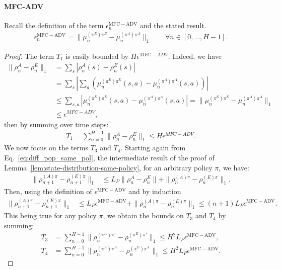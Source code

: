 \documentclass{article}
\begin{document}
\paragraph{MFC-ADV} Recall the definition of the term $\epsilon_n^\mathrm{MFC-ADV}$ and the stated result.
\begin{align}
    \epsilon^{\mathrm{MFC-ADV}}_n = \|\mu^{(\pi^E)\pi^E}_n - \mu^{(\pi^A)\pi^A}_n \|_1 \qquad \forall n \in [0, \dots, H-1].
\end{align}
\mfcgailbound*
\begin{proof}
The term $T_1$ is easily bounded by $H\epsilon^{MFC-ADV}$. Indeed, we have
\begin{align}
    \|\rho_n^A - \rho_n^E\|_1 &= \sum_{s} |\rho_n^A(s) - \rho_n^E(s)|
    \\
    &= \sum_{s} | \sum_a (\mu_n^{(\pi^E)\pi^E}(s,a) - \mu_n^{(\pi^A)\pi^A}(s,a))|
    \\
    &\leq \sum_{s,a} |\mu_n^{(\pi^E)\pi^E}(s,a) - \mu_n^{(\pi^A)\pi^A}(s,a)| = \|\mu_n^{(\pi^E)\pi^E} - \mu_n^{(\pi^A)\pi^A}\|_1
    \\
    &\leq \epsilon^{MFC-ADV},
\end{align}
then by summing over time steps:
\begin{align}
    T_1 = \sum_{n=0}^{H-1}\|\rho_n^A - \rho_n^E\|_1 \le H\epsilon^{MFC-ADV}.
\end{align}
We now focus on the terms $T_3$ and $T_4$.
Starting again from Eq.~\eqref{eq:diff_pop_same_pol}, the intermediate result of the proof of Lemma~\ref{lem:state-distribution-same-policy}, for an arbitrary policy $\pi$, we have:
\begin{align}
     \|\rho_{n+1}^{(A)\pi} - \rho_{n+1}^{(E)\pi}\|_1 &\leq L_P\|\rho_n^A - \rho_n^E\| + \|\rho_n^{(A)\pi} - \rho_n^{(E)\pi}\|_1.
\end{align}
Then, using the definition of $\epsilon^{\mathrm{MFC-ADV}}$ and by induction
\begin{align}
     \|\rho_{n+1}^{(A)\pi} - \rho_{n+1}^{(E)\pi}\|_1 &\leq L_P \epsilon^{\mathrm{MFC-ADV}} + \|\rho_n^{(A)\pi} - \rho_n^{(E)\pi}\|_1 \le (n+1)L_P \epsilon^{\mathrm{MFC-ADV}}. \label{eq:toto}
\end{align}
This being true for any policy $\pi$, we obtain the bounds on $T_3$ and $T_4$ by summing:
\begin{align}
    T_3 &= \sum_{n=0}^{H-1}\|\rho_n^{(\pi^A)\pi'} - \rho_n^{(\pi^E)\pi'}\|_1 \le H^2L_P\epsilon^{\mathrm{MFC-ADV}},
    \\
    T_4 &= \sum_{n=0}^{H-1}\|\rho_n^{(\pi^A)\pi^A} - \rho_n^{(\pi^E)\pi^A}\|_1 \le H^2L_P\epsilon^{\mathrm{MFC-ADV}}.

\end{align}
\end{proof}
\end{document}
